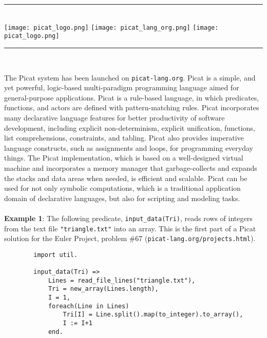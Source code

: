 \documentclass{article}[12pt]
\begin{document}
\begin{center}
\noindent
\rule{6.5in}{1pt}\\
\texttt{[image: picat\_logo.png]}
\hspace{0.635in}
\texttt{[image: picat\_lang\_org.png]}
\hspace{0.635in}
\texttt{[image: picat\_logo.png]}\\
\rule{6.5in}{1pt}\\
\end{center}

\indent
\large{
The Picat system has been launched on \texttt{picat-lang.org}. 
Picat is a simple, and yet powerful, logic-based multi-paradigm
programming language aimed for general-purpose applications. Picat is
a rule-based language, in which predicates, functions, and actors are
defined with pattern-matching rules. Picat incorporates many
declarative language features for better productivity of software
development, including explicit non-determinism, explicit
unification, functions, list comprehensions, constraints, and
tabling. Picat also provides imperative language constructs, such as
assignments and loops, for programming everyday things. The Picat
implementation, which is based on a well-designed virtual machine and
incorporates a memory manager that garbage-collects and expands the
stacks and data areas when needed, is efficient and scalable. Picat
can be used for not only symbolic computations, which is a
traditional application domain of declarative languages, but also for
scripting and modeling tasks. }
\\
\\
\large{{\bf Example 1}: The following predicate, \texttt{input\_data(Tri)}, reads rows of
integers from the text file \texttt{"triangle.txt"} into an array. This is the
first part of a Picat solution for the Euler Project, problem \#67 (\texttt{picat-lang.org/projects.html}).}

\begin{verbatim} 
        import util.
        
        input_data(Tri) => 
            Lines = read_file_lines("triangle.txt"),
            Tri = new_array(Lines.length),
            I = 1,
            foreach(Line in Lines)
                Tri[I] = Line.split().map(to_integer).to_array(),
                I := I+1
            end.
\end{verbatim}
\end{document}
